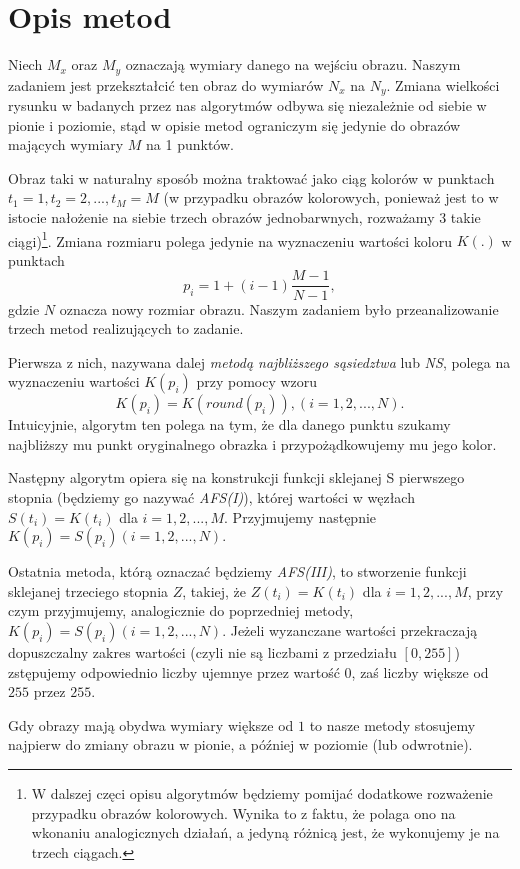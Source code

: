 \section{Opis metod}
Niech $M_x$ oraz $M_y$ oznaczają wymiary danego na wejściu obrazu. Naszym
zadaniem jest przekształcić ten obraz do wymiarów $N_x$ na $N_y$. Zmiana
wielkości rysunku w badanych przez nas algorytmów odbywa się niezależnie od
siebie w pionie i poziomie, stąd w opisie metod ograniczym się jedynie do
obrazów mających wymiary $M$ na 1 punktów.

Obraz taki w naturalny sposób można traktować jako ciąg kolorów w punktach
$t_1=1,t_2=2,...,t_M=M$ (w przypadku obrazów kolorowych, ponieważ jest to w
istocie nałożenie na siebie trzech obrazów jednobarwnych, rozważamy 3 takie
ciągi)\footnote{W dalszej częci opisu algorytmów będziemy pomijać dodatkowe
rozważenie przypadku obrazów kolorowych. Wynika to z faktu, że polaga ono na
wkonaniu analogicznych działań, a jedyną różnicą jest, że wykonujemy je na
trzech ciągach.}. Zmiana rozmiaru polega jedynie na wyznaczeniu wartości koloru
$K(.)$ w punktach
$$p_i=1+(i-1)\frac{M-1}{N-1},$$
gdzie $N$ oznacza nowy rozmiar obrazu. Naszym zadaniem było przeanalizowanie
trzech metod realizujących to zadanie.

Pierwsza z nich, nazywana dalej \textit{metodą najbliższego sąsiedztwa} lub \textit{NS}, polega
na wyznaczeniu wartości $K(p_i)$ przy pomocy wzoru
$$K(p_i)=K(round(p_i)), (i=1,2,...,N).$$
Intuicyjnie, algorytm ten polega na tym, że dla danego punktu szukamy najbliższy
mu punkt oryginalnego obrazka i przypożądkowujemy mu jego kolor.

Następny algorytm opiera się na konstrukcji funkcji sklejanej S pierwszego
stopnia (będziemy go nazywać \textit{AFS(I)}), której wartości w węzłach $S(t_i)
=K(t_i)$ dla $i=1,2,...,M$. Przyjmujemy następnie $K(p_i)=S(p_i) (i=1,2,...,N).$

Ostatnia metoda, którą oznaczać będziemy \textit{AFS(III)}, to stworzenie
funkcji sklejanej trzeciego stopnia $Z$, takiej, że $Z(t_i)=K(t_i)$ dla
$i=1,2,...,M$, przy czym przyjmujemy, analogicznie do poprzedniej metody,
$K(p_i)=S(p_i) (i=1,2,...,N)$. Jeżeli wyzanczane wartości przekraczają
dopuszczalny zakres wartości (czyli nie są liczbami z przedziału $[0,255]$)
zstępujemy odpowiednio liczby ujemnye przez wartość $0$, zaś liczby większe od
$255$ przez $255$.

Gdy obrazy mają obydwa wymiary większe od $1$ to nasze metody stosujemy najpierw
do zmiany obrazu w pionie, a później w poziomie (lub odwrotnie).

